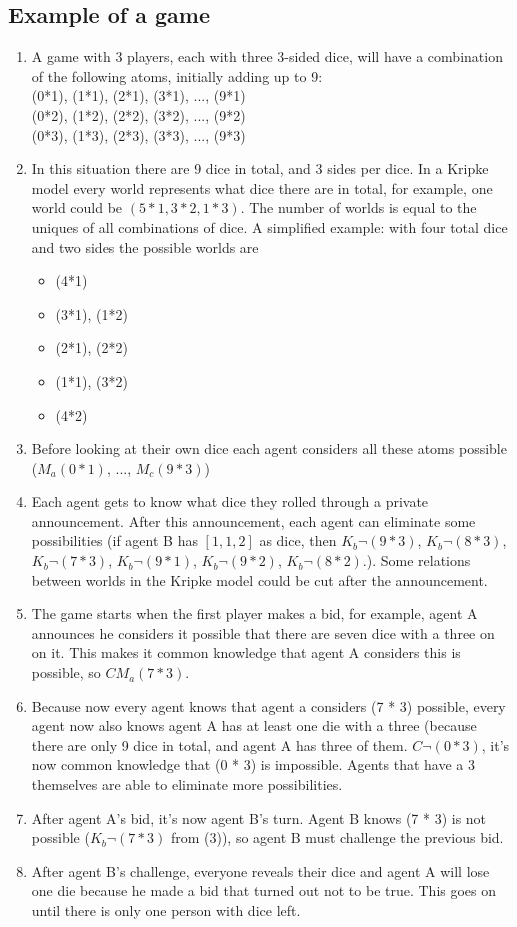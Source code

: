 \documentclass{article}
\begin{document}
\subsection*{Example of a game}
\begin{enumerate}
    \item A game with 3 players, each with three 3-sided dice, will have a combination of the following atoms, initially adding up to 9:\\
    (0*1), (1*1), (2*1), (3*1), ..., (9*1)\\
    (0*2), (1*2), (2*2), (3*2), ..., (9*2)\\
    (0*3), (1*3), (2*3), (3*3), ..., (9*3)\\
    \item In this situation there are 9 dice in total, and 3 sides per dice. In a Kripke model every world represents what dice there are in total, for example, one world could be $(5*1, 3*2, 1*3)$. The number of worlds is equal to the uniques of all combinations of dice. A simplified example: with four total dice and two sides the possible worlds are
    \begin{itemize}
        \item (4*1)
        \item (3*1), (1*2)
        \item (2*1), (2*2)
        \item (1*1), (3*2)
        \item (4*2)
    \end{itemize}
    \item Before looking at their own dice each agent considers all these atoms possible ($M_a(0*1)$, ..., $M_c(9*3)$)
    \item Each agent gets to know what dice they rolled through a private announcement. After this announcement, each agent can eliminate some possibilities (if agent B has $[1, 1, 2]$ as dice, then $K_b \neg (9 * 3)$, $K_b \neg (8 * 3)$, $K_b \neg (7 * 3)$, $K_b \neg (9 * 1)$, $K_b \neg (9 * 2)$, $K_b \neg (8 * 2)$.). Some relations between worlds in the Kripke model could be cut after the announcement.
    \item The game starts when the first player makes a bid, for example, agent A announces he considers it possible that there are seven dice with a three on on it. This makes it common knowledge that agent A considers this is possible, so $CM_a(7 * 3)$.
    \item Because now every agent knows that agent a considers (7 * 3) possible, every agent now also knows agent A has at least one die with a three (because there are only 9 dice in total, and agent A has three of them. $C \neg (0 * 3)$, it's now common knowledge that (0 * 3) is impossible. Agents that have a 3 themselves are able to eliminate more possibilities. 
    \item After agent A's bid, it's now agent B's turn. Agent B knows (7 * 3) is not possible ($K_b \neg (7 * 3)$ from (3)), so agent B must challenge the previous bid.
    \item After agent B's challenge, everyone reveals their dice and agent A will lose one die because he made a bid that turned out not to be true. This goes on until there is only one person with dice left.
\end{enumerate}
\end{document}
